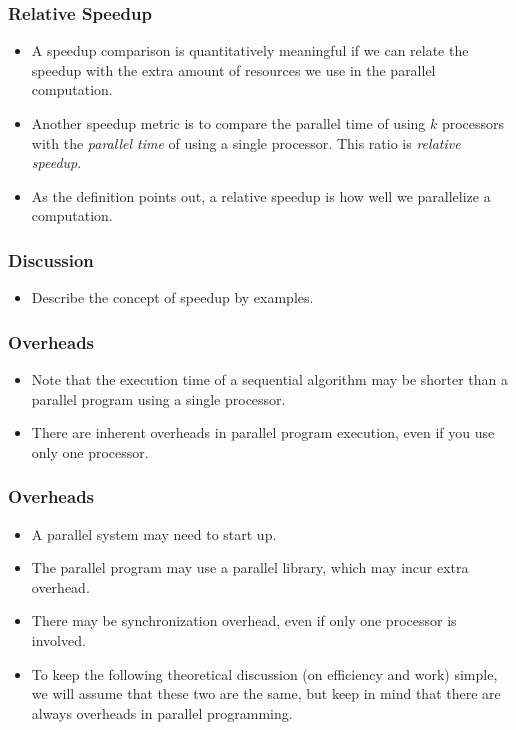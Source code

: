 \documentclass{beamer}
\begin{document}
\begin{CJK}{UTF8}{bsmi}
\begin{frame}
\frametitle{Relative Speedup}
\begin{itemize}
\item A speedup comparison is quantitatively meaningful if we can relate
  the speedup with the extra amount of resources we use in the
  parallel computation.
\item Another speedup metric is to compare the parallel time of using $k$ processors with the {\em parallel time} of using a single processor.  
This ratio is {\em relative speedup}.
\item As the definition points out, a relative speedup is how well we parallelize a computation.
\end{itemize}
\end{frame}


\begin{frame}
\frametitle{Discussion}
\begin{itemize}
\item Describe the concept of speedup by examples.
\end{itemize}
\end{frame}

\begin{frame}
\frametitle{Overheads}
\begin{itemize}
\item Note that the execution time of a sequential algorithm may be shorter than a parallel program using a single processor.
\item There are inherent overheads in parallel program execution, even if you use only one processor.
\end{itemize}
\end{frame}

\begin{frame}
\frametitle{Overheads}
\begin{itemize}
\item A parallel system may need to start up.
\item The parallel program may use a parallel library, which may incur extra overhead.
\item There may be synchronization overhead, even if only one processor is involved.
\item To keep the following theoretical discussion (on efficiency and work) simple, we will assume that these two are the same, but keep in mind that there are always overheads in parallel programming.
\end{itemize}
\end{frame}



\end{CJK}
\end{document}
